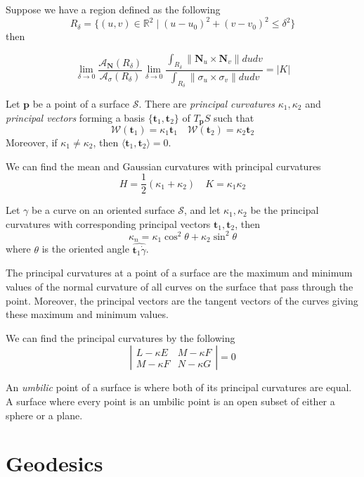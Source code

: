 \documentclass[12pt]{article}
\begin{document}
\begin{multicols*}{2}
Suppose we have a region defined as the following \[R_\delta = \{(u, v) \in \mathbb{R}^2\;|\;(u - u_0)^2 + (v - v_0)^2 \leq \delta^2\}\] then

\[\lim_{\delta \rightarrow 0}\frac{\mathcal{A}_{\mathbf{N}}(R_{\delta})}{\mathcal{A}_{\sigma}(R_{\delta})} \lim_{\delta \rightarrow 0}\frac{\int_{R_\delta}\lVert\mathbf{N}_u \times\mathbf{N}_v\rVert dudv}{\int_{R_\delta}\lVert\sigma_u \times\sigma_v\rVert dudv}= |K |\]

Let $\mathbf{p}$ be a point of a surface $\mathcal{S}$. There are \textit{principal curvatures} $\kappa_1, \kappa_2$ and \textit{principal vectors} forming a basis $\{\mathbf{t}_1, \mathbf{t}_2\}$ of $T_\mathbf{p}S$ such that \[\mathcal{W}(\mathbf{t}_1) = \kappa_1 \mathbf{t}_1\quad \mathcal{W}(\mathbf{t}_2) = \kappa_2 \mathbf{t}_2\] Moreover, if $\kappa_1 \neq \kappa_2$, then $\langle\mathbf{t}_1, \mathbf{t}_2\rangle = 0$.

We can find the mean and Gaussian curvatures with principal curvatures \[H = \frac{1}{2}(\kappa_1 + \kappa_2)\quad K = \kappa_1\kappa_2\]

Let $\gamma$ be a curve on an oriented surface $\mathcal{S}$, and let $\kappa_1, \kappa_2$ be the principal curvatures with corresponding principal vectors $\mathbf{t}_1, \mathbf{t}_2$, then \[\kappa_n = \kappa_1\cos^2\theta + \kappa_2\sin^2\theta\] where $\theta$ is the oriented angle $\hat{\mathbf{t}_1\dot{\gamma}}$.

The principal curvatures at a point of a surface are the maximum and minimum values of the normal curvature of all curves on the surface that pass through the point. Moreover, the principal vectors are the tangent vectors of the curves giving these maximum and minimum values.

We can find the principal curvatures by the following \[\left|\begin{array}{cc}
    L - \kappa E & M - \kappa F \\
    M - \kappa F & N - \kappa G
\end{array}\right| = 0\]

An \textit{umbilic} point of a surface is where both of its principal curvatures are equal. A surface where every point is an umbilic point is an open subset of either a sphere or a plane.

\section*{Geodesics}


\end{multicols*}
\end{document}
